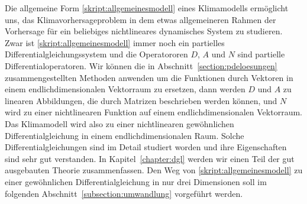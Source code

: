 Die allgemeine Form \eqref{skript:allgemeinesmodell} eines Klimamodells
ermöglicht uns, das Klimavorhersageproblem in dem etwas allgemeineren
Rahmen der Vorhersage für ein beliebiges nichtlineares dynamisches
System zu studieren.
Zwar ist \eqref{skript:allgemeinesmodell} immer noch ein partielles
Differentialgleichungssystem und die Operatororen $D$, $A$ und $N$
sind partielle Differentialoperatoren.
Wir können die in Abschnitt~\ref{section:pdeloesungen} zusammengestellten
Methoden anwenden um die Funktionen durch
Vektoren in einem endlichdimensionalen Vektorraum zu ersetzen, dann
werden $D$ und $A$ zu linearen Abbildungen, die durch Matrizen beschrieben
werden können, und $N$ wird zu einer nichtlinearen Funktion auf einem
endlichdimensionalen Vektorraum.
Das Klimamodell wird also zu einer nichtlinearen gewöhnlichen
Differentialgleichung in einem endlichdimensionalen Raum.
Solche Differentialgleichungen sind im Detail studiert worden und ihre
Eigenschaften sind sehr gut verstanden.
In Kapitel~\ref{chapter:dgl} werden wir einen Teil der gut ausgebauten
Theorie zusammenfassen.
Den Weg von \eqref{skript:allgemeinesmodell} zu einer gewöhnlichen
Differentialgleichung in nur drei Dimensionen soll im folgenden 
Abschnitt~\ref{subsection:umwandlung} vorgeführt werden.


